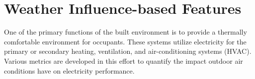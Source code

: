 \section{Weather Influence-based Features}
\label{sec:weatherfeatures}

One of the primary functions of the built environment is to provide a thermally comfortable environment for occupants. These systems utilize electricity for the primary or secondary heating, ventilation, and air-conditioning systems (HVAC). Various metrics are developed in this effort to quantify the impact outdoor air conditions have on electricity performance.